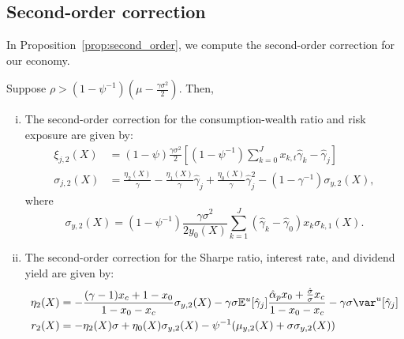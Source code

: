 \subsection{Second-order correction}\label{app:prop_second_order}
In Proposition~\ref{prop:second_order}, we compute the second-order correction for our economy. 
\begin{prop}\label{prop:second_order}
	Suppose $\rho>\left(1-\psi^{-1}\right)\left( \mu - \frac{\gamma
		\sigma^2}{2}  \right)$.  Then,
	\begin{enumerate}[(i)]
		\item The second-order correction for the consumption-wealth ratio and risk exposure are given by:
		\begin{align}
			\xi_{j,2}(X) &= (1-\psi) \frac{\gamma \sigma^2}{2} \left[ \left(1-\psi^{-1}\right) \sum_{k=0}^J x_{k,t} \hat{\gamma}_k -\hat{\gamma}_j \right]\\
			\sigma_{j,2}(X) &= \frac{\eta_2(X)}{\gamma} - \frac{\eta_1(X)}{\gamma}\hat{\gamma}_j + \frac{\eta_0(X)}{\gamma}\hat{\gamma}_j^2 - (1-\gamma^{-1})   \sigma_{y,2}(X),
		\end{align}
		where 
		\begin{equation}
			\sigma_{y,2}(X)  = \left(1-\psi^{-1}\right)\frac{\gamma\sigma^2}{2 y_{0}(X)} \sum_{k=1}^J \left( \hat{\gamma}_k - \hat{\gamma}_0  \right) x_k \sigma_{k,1}(X).
		\end{equation}
		\item The second-order correction for the Sharpe ratio, interest rate, and dividend yield are given by:
		\begin{align}		
			\eta_2(X) &=  - \frac{(\gamma-1) x_c + 1-x_0}{1-x_0-x_c} \sigma_{y,2}(X) - \gamma \sigma \mathbb{E}^u[\hat{\gamma}_j] \frac{ \hat{\alpha}_p x_0+ \frac{\hat{\sigma}}{\sigma}x_c }{1-x_0-x_c} - \gamma \sigma \var^u[\hat{\gamma}_j]\\	
			r_2(X) &= - \eta_2(X) \sigma + \eta_0(X) \sigma_{y,2}(X)-\psi^{-1} (\mu_{y,2}(X) + \sigma \sigma_{y,2}(X))\nonumber\\

\end{align}
\end{enumerate}
\end{prop}
